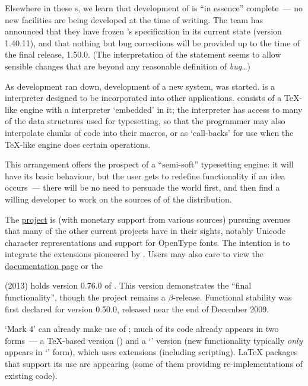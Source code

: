 
Elsewhere in these s, we learn that development of
 is ``in essence'' complete~--- no new
facilities are being developed at the time of writing.  The \PDFTeX{}
team has announced that they have frozen \PDFTeX{}'s specification in
its current state (version 1.40.11), and that nothing but bug
corrections will be provided up to the time of the final release,
\PDFTeX{} 1.50.0.  (The interpretation of the statement seems to allow
sensible changes that are beyond any reasonable definition of
\emph{bug}\dots{})

As \PDFTeX{} development ran down,
development of a new system, \LuaTeX{} was started.
\href{http://www.lua.org/}{} is a interpreter designed
to be incorporated into other applications.  \LuaTeX{} consists of a
\TeX{}-like engine with a  interpreter `embedded' in it;
the  interpreter has access to many of the data
structures used for typesetting, so that the programmer may also
interpolate chunks of  code into their \AllTeX{} macros,
or as `call-backs' for use when the \TeX{}-like engine does certain
operations.

This arrangement offers the prospect of a ``semi-soft'' typesetting
engine: it will have its basic behaviour, but the user gets to
redefine functionality if an idea occurs~--- there will be no need to
persuade the world first, and then find a willing developer to work on
the sources of of the distribution.

The \href{http://www.luatex.org/}{\LuaTeX{} project} is (with monetary
support from various sources) pursuing avenues that many of the other
current projects have in their sights, notably Unicode character
representations and support for OpenType fonts.  The intention is
to integrate the extensions pioneered by .
Users may also care to view the %
\href{http://www.luatex.org/documentation.html}{\LuaTeX{} documentation page}
or the \href{http://wiki.luatex.org}{\LuaTeX{} }

\texlive{} (2013) holds version 0.76.0 of \LuaTeX{}.  This version
demonstrates the ``final functionality'', though the project
remains a \ensuremath{\beta}-release.  Functional stability was first
declared for version 0.50.0, released near the end of December 2009.

\CONTeXT{} `Mark 4' can already make use of \LuaTeX{}; much of its
code already appears in two forms~--- a \TeX{}-based version
() and a `' version (new functionality
typically \emph{only} appears in `' form), which uses
\LuaTeX{} extensions (including  scripting).  \LaTeX{}
packages that support its use are appearing (some of them providing
re-implementations of existing \context{} code).

